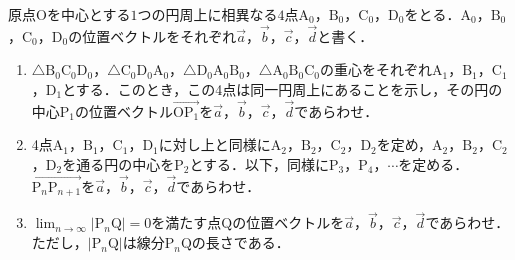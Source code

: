 \documentclass[../../main.tex]{subfiles}
\begin{document}
原点$\mathrm{O}$を中心とする$1$つの円周上に相異なる$4$点$\mathrm{A}_0$，$\mathrm{B}_0$，$\mathrm{C}_0$，$\mathrm{D}_0$をとる．$\mathrm{A}_0$，$\mathrm{B}_0$，$\mathrm{C}_0$，$\mathrm{D}_0$の位置ベクトルをそれぞれ$\vec{a}$，$\vec{b}$，$\vec{c}$，$\vec{d}$と書く．

\begin{enumerate}
  \item $\triangle \mathrm{B_0C_0D_0}$，$\triangle \mathrm{C_0D_0A_0}$，$\triangle \mathrm{D_0A_0B_0}$，$\triangle \mathrm{A_0B_0C_0}$の重心をそれぞれ$\mathrm{A}_1$，$\mathrm{B}_1$，$\mathrm{C}_1$，$\mathrm{D}_1$とする．このとき，この4点は同一円周上にあることを示し，その円の中心$\mathrm{P}_1$の位置ベクトル$\overrightarrow{\mathrm{OP_1}}$を$\vec{a}$，$\vec{b}$，$\vec{c}$，$\vec{d}$であらわせ．
  \item 4点$\mathrm{A}_1$，$\mathrm{B}_1$，$\mathrm{C}_1$，$\mathrm{D}_1$に対し上と同様に$\mathrm{A}_2$，$\mathrm{B}_2$，$\mathrm{C}_2$，$\mathrm{D}_2$を定め，$\mathrm{A}_2$，$\mathrm{B}_2$，$\mathrm{C}_2$，$\mathrm{D}_2$を通る円の中心を$\mathrm{P}_2$とする．以下，同様に$\mathrm{P}_3$，$\mathrm{P}_4$，$\cdots$を定める．$\overrightarrow{\mathrm{P}_n\mathrm{P}_{n+1}}$を$\vec{a}$，$\vec{b}$，$\vec{c}$，$\vec{d}$であらわせ．
  \item ${\displaystyle \lim_{n\to\infty} |\mathrm{P}_n\mathrm{Q}|=0}$を満たす点$\mathrm{Q}$の位置ベクトルを$\vec{a}$，$\vec{b}$，$\vec{c}$，$\vec{d}$であらわせ．ただし，$|\mathrm{P}_n\mathrm{Q}|$は線分$\mathrm{P}_n\mathrm{Q}$の長さである．
\end{enumerate}
\end{document}

